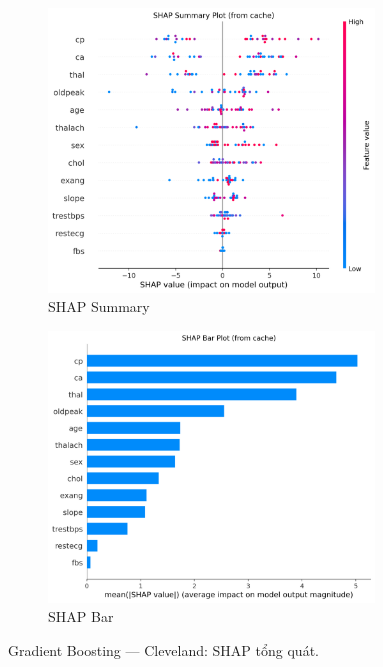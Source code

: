 \begin{figure}[H]
\centering
\begin{subfigure}[b]{0.48\textwidth}\centering
\includegraphics[width=0.95\textwidth]{Result/cleveland_dataset/GB/SHAP/Summary.png}
\caption{SHAP Summary}\label{fig:gb_clev_shap_summary}
\end{subfigure}\hfill
\begin{subfigure}[b]{0.48\textwidth}\centering
\includegraphics[width=0.95\textwidth]{Result/cleveland_dataset/GB/SHAP/Bar.png}
\caption{SHAP Bar}\label{fig:gb_clev_shap_bar}
\end{subfigure}
\caption{Gradient Boosting — Cleveland: SHAP tổng quát.}
\label{fig:gb_clev_shap_overview}
\end{figure}

